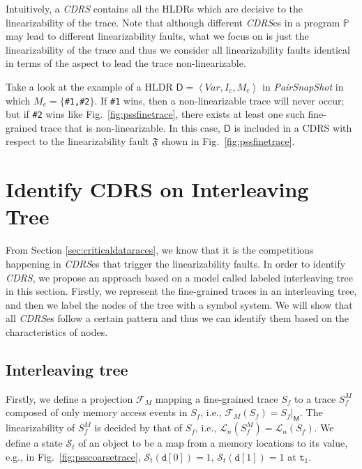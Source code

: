 \documentclass[runningheads]{llncs}
\newcommand{\se}{\mathit{I_e}}
\newcommand{\ce}{\mathit{M_e}}
\begin{document}
Intuitively, a \textit{CDRS} contains all the HLDRs which are decisive to the linearizability of the trace. Note that although different \textit{CDRS}es in a program $\mathbb{P}$ may lead to different linearizability faults, what we focus on is just the linearizability of the trace and thus we consider all linearizability faults identical in terms of the aspect to lead the trace non-linearizable.

\begin{example} 

Take a look at the example of a HLDR $\mathsf{D}  = \left\langle \mathit{Var}, \se, \ce\right\rangle$  in \textit{PairSnapShot} in which $\ce = \{$\texttt{\#1,\#2}$\}$. If \texttt{\#1} wins, then a non-linearizable trace will never occur; but if \texttt{\#2} wins like Fig.~\ref{fig:pssfinetrace}, there exists at least one such fine-grained trace that is non-linearizable. In this case,  $\mathsf{D}$ is included in a CDRS with respect to the linearizability fault $\mathfrak{F}$ shown in Fig.~\ref{fig:pssfinetrace}.

\end{example}

\vspace{-0.2cm}


\section{Identify CDRS on Interleaving Tree}\label{sec:intertree}
From Section \ref{sec:criticaldataraces}, we know that it is the competitions happening in \textit{CDRS}es that trigger the linearizability faults. In order to identify \textit{CDRS}, we propose an approach based on a model called labeled interleaving tree in this section. Firstly, we represent the fine-grained traces in an interleaving tree, and then we label the nodes of the tree with a symbol system. We will show that all \textit{CDRS}es follow a certain pattern and thus we can identify them based on the characteristics of nodes. 
\subsection{Interleaving tree}

Firstly, we define a projection $\mathcal{F}_M$ mapping a fine-grained trace $S_f$ to a trace $S^M_f$ composed of only memory access events in $S_f$, i.e., $\mathcal{F}_M(S_f) = S_f|_{\mathsf{M}}$. The linearizability of $S^M_f$ is decided by that of $S_f$, i.e., $\mathcal{L}_n(S^M_f)  = \mathcal{L}_n(S_f)$. We define a state $\mathcal{S}_t$ of an object to be a map from a memory locations to its value, e.g., in 
Fig.~\ref{fig:psscoarsetrace}, $\mathcal{S}_t(\mathtt{d}[0]) = 1$, $\mathcal{S}_t(\mathtt{d}[1]) = 1$ at $\mathtt{t}_1$.
\end{document}

